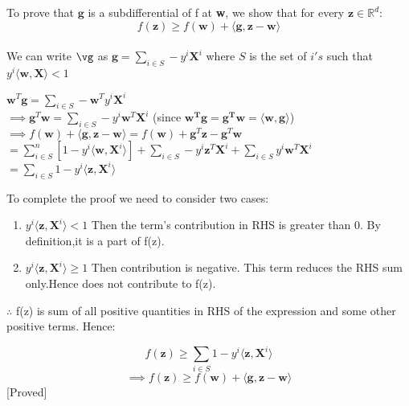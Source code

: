 \documentclass[a4paper,11pt]{article}
\begin{document}
\begin{mlsolution}

To prove that $\textbf{g}$ is a subdifferential of f at \textbf{w}, we show that for every $\textbf{z} \in \mathbb{R}^d$:
	$$ f(\textbf{z}) \geq f(\textbf{w}) + \langle\textbf{g}, \textbf{z} - \textbf{w}\rangle$$\\
We can write $\vg$ as $\textbf{g} = \sum\limits_{i \in S} -y^i\textbf{X}^i$ where $S$ is the set of $i's$ such that $y^i\langle\textbf{w}, \textbf{X}\rangle < 1$\\
	\begin{center}		
		$\textbf{w}^T\textbf{g} = \sum\limits_{i \in S} -\textbf{w}^T y^i\textbf{X}^i$\\
		$\implies \textbf{g}^T\textbf{w} = \sum\limits_{i \in S} -y^i\textbf{w}^T\textbf{X}^i$ (since $\mathbf{w^Tg = g^Tw = \langle w,g\rangle}$)\\
		$\implies f(\textbf{w}) + \langle\textbf{g}, \textbf{z} - \textbf{w}\rangle = f(\textbf{w}) + \textbf{g}^T\textbf{z} - \textbf{g}^T\textbf{w}$\\
				$= \sum\limits_{i \in S}^{n}[1 - y^i \langle\textbf{w}, \textbf{X}^i\rangle] + \sum\limits_{i \in S} -y^i\textbf{z}^T\textbf{X}^i + \sum\limits_{i \in S} y^i\textbf{w}^T\textbf{X}^i$\\
				$= \sum\limits_{i \in S} 1 - y^i \langle \textbf{z}, \textbf{X}^i\rangle$
	\end{center}
To complete the proof we need to consider two cases:
	\begin{enumerate}
	
		\item $y^i \langle \textbf{z},\textbf{X}^i\rangle < 1$ Then the term's contribution in RHS is greater than 0. By definition,it is a part of f(z).
		\item $y^i \langle \textbf{z},\textbf{X}^i\rangle \geq 1$ Then contribution is negative. This term reduces the RHS sum only.Hence does not contribute to f(z).
	\end{enumerate}
	$\therefore$ f(z) is sum of all positive quantities in RHS of the expression and some other positive terms. Hence:
	\begin{center}
				$$ f(\textbf{z}) \geq \sum\limits_{i \in S} 1 - y^i \langle \textbf{z}, \textbf{X}^i\rangle$$
			$$\implies f(\textbf{z}) \geq f(\textbf{w}) + \langle\textbf{g}, \textbf{z} - \textbf{w}\rangle$$ [Proved]
	\end{center}
\end{mlsolution}
\end{document}

